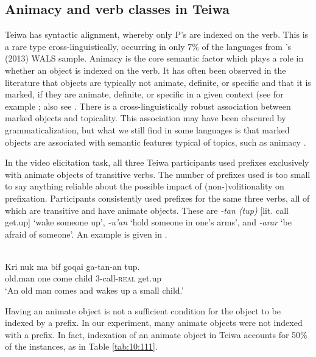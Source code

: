\subsection{Animacy and verb classes in Teiwa}
\label{sec:10:5.3}
Teiwa has syntactic alignment, whereby only P's are indexed on the verb. This is a rare type cross-linguistically, occurring in only 7\% of the languages from \citeauthor{Siewierska2013}'s (2013)  WALS sample. Animacy is the core semantic factor which plays a role in whether an object is indexed on the verb. It has often been observed in the literature that objects are typically not animate, definite, or specific and that it is marked, if they are animate, definite, or specific in a given context (see for example \citet{Givon1976,Aissen2003}; also see \citet[205-205]{Bickel2008}. There is a cross-linguistically robust association between marked objects and topicality. This association may have been obscured by grammaticalization, but what we still find in some languages is that marked objects are associated with semantic features typical of topics, such as animacy \citep[2]{DalrympleEtAl2011}. 

In the video elicitation task, all three Teiwa participants used prefixes exclusively with animate objects of transitive verbs. The number of prefixes used is too small to say anything reliable about the possible impact of (non-)volitionality on prefixation. Participants consistently used prefixes for the same three verbs, all of which are transitive and have animate objects. These are \textit{{}-tan (tup)} [lit. call get.up] `wake someone up', \textit{{}-u'an} `hold someone in one's arms', and \textit{{}-arar} `be afraid of someone'. An example is given in .


\ea%
\label{bkm:Ref283206596}
 \\ 
\gll   Kri  nuk  ma    {bif goqai}  ga-tan-an  tup. \\  
   old.man  one  come  child  3-call-\textsc{real} get.up  \\
\glt `An old man comes and wakes up a small child.' 
\z




Having an animate object is not a sufficient condition for the object to be indexed by a prefix. In our experiment, many animate objects were not indexed with a prefix. In fact, indexation of an animate object in Teiwa accounts for 50\% of the instances, as in Table \ref{tab:10:111}. 

